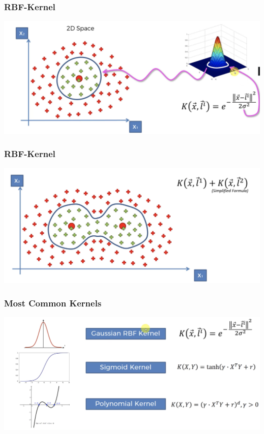 \documentclass[compress, aspectratio=54]{beamer}
\begin{document}
\begin{frame}
\frametitle{RBF-Kernel}
\includegraphics[width=0.85\linewidth ]{Figures/svm-rbf3.png}

\end{frame}


\begin{frame}
\frametitle{RBF-Kernel}
\includegraphics[width=0.85\linewidth ]{Figures/svm-rbf4.png}

\end{frame}

\begin{frame}
\frametitle{Most Common Kernels}
\includegraphics[width=1\linewidth ]{Figures/svm-most-common-kernels.png}

\end{frame}
\end{document}
